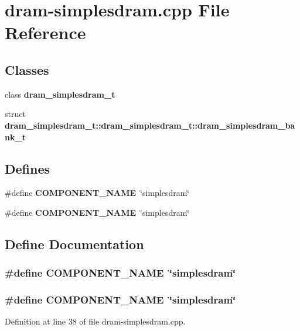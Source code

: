 \section{dram-simplesdram.cpp File Reference}
\label{dram-simplesdram_8cpp}
\subsection*{Classes}
\begin{CompactItemize}
\item 
class {\bf dram\_\-simplesdram\_\-t}
\item 
struct {\bf dram\_\-simplesdram\_\-t::dram\_\-simplesdram\_\-t::dram\_\-simplesdram\_\-bank\_\-t}
\end{CompactItemize}
\subsection*{Defines}
\begin{CompactItemize}
\item 
\#define {\bf COMPONENT\_\-NAME}~\char`\"{}simplesdram\char`\"{}
\item 
\#define {\bf COMPONENT\_\-NAME}~\char`\"{}simplesdram\char`\"{}
\end{CompactItemize}


\subsection{Define Documentation}
\subsubsection[{COMPONENT\_\-NAME}]{\setlength{\rightskip}{0pt plus 5cm}\#define COMPONENT\_\-NAME~\char`\"{}simplesdram\char`\"{}}\label{zesto-dram_8cpp_9146ade7ce24e3db226a973a59063892}


\subsubsection[{COMPONENT\_\-NAME}]{\setlength{\rightskip}{0pt plus 5cm}\#define COMPONENT\_\-NAME~\char`\"{}simplesdram\char`\"{}}\label{dram-simplesdram_8cpp_9146ade7ce24e3db226a973a59063892}




Definition at line 38 of file dram-simplesdram.cpp.